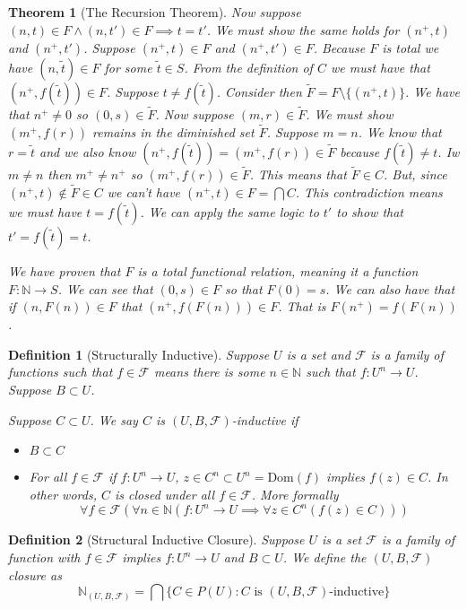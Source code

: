 \documentclass[12pt]{article}
\theoremstyle{break}
\newtheorem{definition}{Definition}[section]
\theoremstyle{break}
\newtheorem{theorem}{Theorem}[section]
\theoremstyle{break}
\theoremstyle{break}
\theoremstyle{break}
\newtheorem{informal definition}[definition]{Informal Definition}
\begin{document}
\begin{theorem}[The Recursion Theorem]
Now suppose $(n, t) \in F \land (n, t') \in F \implies t=t'$.
We must show the same holds for $(n^+, t)$ and $(n^+, t')$.
Suppose $(n^+, t) \in F$ and $(n^+, t') \in F$.
Because $F$ is total we have $(n, \tilde{t}) \in F$ for some $\tilde{t} \in S$.
From the definition of $C$ we must have that $(n^+, f(\tilde{t})) \in F$.
Suppose $t \not = f(\tilde{t})$.
Consider then $\tilde{F} = F \setminus \{(n^+, t)\}$.
We have that $n^+\not = 0$ so $(0, s)\in \tilde{F}$.
Now suppose $(m, r) \in \tilde{F}$.
We must show $(m^+, f(r))$ remains in the diminished set $\tilde{F}$.
Suppose $m=n$.
We know that $r=\tilde{t}$ and we also know $(n^+, f(\tilde{t})) = (m^+, f(r)) \in \tilde{F}$ because $f(\tilde{t}) \not = t$.
Iw $m\not = n$ then $m^+ \not = n^+$ so $(m^+, f(r)) \in \tilde{F}$.
This means that $\tilde{F} \in C$.
But, since $(n^+, t)\not \in \tilde{F} \in C$ we can't have $(n^+, t) \in F = \bigcap C$.
This contradiction means we must have $t = f(\tilde{t})$.
We can apply the same logic to $t'$ to show that $t' = f(\tilde{t}) = t$.

We have proven that $F$ is a total functional relation, meaning it a function $F: \mathbb{N}\to S$.
We can see that $(0, s)\in F$ so that $F(0) = s$.
We can also have that if $(n, F(n)) \in F$ that $(n^+, f(F(n))) \in F$.
That is $F(n^+) = f(F(n))$.
\end{theorem}

\begin{definition}[Structurally Inductive]
Suppose $U$ is a set and $\mathcal{F}$ is a family of functions such that $f \in \mathcal{F}$ means there is some $n\in \mathbb{N}$ such that $f: U^n \to U$.
Suppose $B \subset U$.

Suppose $C \subset U$.
We say $C$ is $(U, B, \mathcal{F})$-inductive if
\begin{itemize}
\item{$B\subset C$}
\item{For all $f\in \mathcal{F}$ if $f:U^n\to U$, $z\in C^n \subset U^n = \text{Dom}(f)$ implies $f(z)\in C$. In other words, $C$ is closed under all $f\in \mathcal{F}$. More formally
$$
\forall f\in \mathcal{F}(\forall n\in \mathbb{N}(f:U^n \to U \implies \forall z \in C^n (f(z) \in C)))
$$}
\end{itemize}
\end{definition}

\begin{definition}[Structural Inductive Closure]
Suppose $U$ is a set $\mathcal{F}$ is a family of function with $f\in \mathcal{F}$ implies $f:U^n \to U$ and $B\subset U$.
We define the $(U, B, \mathcal{F})$ closure as
$$
\mathbb{N}_{(U, B, \mathcal{F})} = \bigcap \{C \in P(U): C \text{ is } (U, B, \mathcal{F})\text{-inductive} \}
$$
\end{definition}
\end{document}
